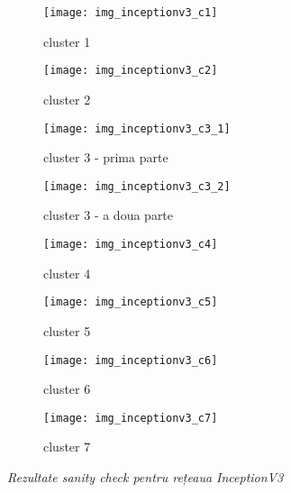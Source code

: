 \begin{figure}[!h]
  \centering
  \begin{subfigure}[t]{0.45\textwidth}
    \caption{cluster 1}
    \texttt{[image: img\_inceptionv3\_c1]}
  \end{subfigure}
  \hfill
  \begin{subfigure}[t]{0.45\textwidth}
    \caption{cluster 2}
    \texttt{[image: img\_inceptionv3\_c2]}
  \end{subfigure}
   \hfill
  \begin{subfigure}[t]{0.45\textwidth}
    \caption{cluster 3 - prima parte}
    \texttt{[image: img\_inceptionv3\_c3\_1]}
  \end{subfigure}
  \hfill
  \begin{subfigure}[t]{0.45\textwidth}
    \caption{cluster 3 - a doua parte}
    \texttt{[image: img\_inceptionv3\_c3\_2]}
  \end{subfigure}
  \hfill
  \begin{subfigure}[t]{0.45\textwidth}
    \caption{cluster 4}
    \texttt{[image: img\_inceptionv3\_c4]}
  \end{subfigure}
  \hfill
  \begin{subfigure}[t]{0.45\textwidth}
    \caption{cluster 5}
    \texttt{[image: img\_inceptionv3\_c5]}
  \end{subfigure}
  \hfill
  \begin{subfigure}[t]{0.45\textwidth}
    \caption{cluster 6}
    \texttt{[image: img\_inceptionv3\_c6]}
  \end{subfigure}
    \hfill
  \begin{subfigure}[t]{0.45\textwidth}
    \caption{cluster 7}
    \texttt{[image: img\_inceptionv3\_c7]}
  \end{subfigure}
  \caption[Rezultate sanity check pentru rețeaua InceptionV3]{\textit{Rezultate sanity check pentru rețeaua InceptionV3}}
\end{figure}


